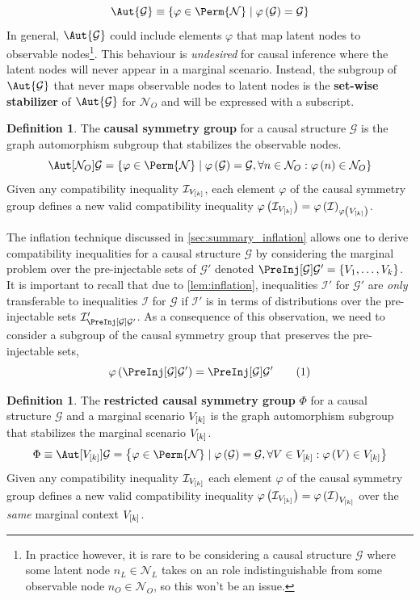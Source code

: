 \documentclass[aps, 10pt, english, twoside, pra, nofootinbib, longbibliography]{revtex4-1}
\theoremstyle{plain}
\theoremstyle{definition}
\newtheorem{definition}[theorem]{Definition}
\theoremstyle{remark}
\newcommand{\graph}{\mathcal{G}}
\newcommand{\nodes}{\mathcal{N}}
\newcommand{\term}[1]{\textcolor{Mahogany}{\textbf{#1}}}
\begin{document}
    \[ \Aut{\graph} \defined \bc{\varphi \in \Perm{\nodes} \mid \varphi\br{\graph} = \graph} \]
    In general, $\Aut{\graph}$ could include elements $\varphi$ that map latent nodes to observable nodes\footnote{In practice however, it is rare to be considering a causal structure $\graph$ where some latent node $n_L \in \nodes_L$ takes on an role indistinguishable from some observable node $n_O \in \nodes_O$, so this won't be an issue.}. This behaviour is \textit{undesired} for causal inference where the latent nodes will never appear in a marginal scenario. Instead, the subgroup of $\Aut{\graph}$ that never maps observable nodes to latent nodes is the \term{set-wise stabilizer} of $\Aut{\graph}$ for $\nodes_O$ and will be expressed with a subscript.

    \begin{definition}
        The \term{causal symmetry group} for a causal structure $\graph$ is the graph automorphism subgroup that stabilizes the observable nodes.
        \[ \Aut[\nodes_O]{\graph} = \bc{\varphi \in \Perm{\nodes} \mid \varphi\br{\graph} = \graph, \forall n \in \nodes_O :\varphi\br{n} \in \nodes_O} \]
        Given any compatibility inequality $\mathcal{I}_{V_{\left[ k \right]}}$, each element $\varphi$ of the causal symmetry group defines a new valid compatibility inequality $\varphi\left( \mathcal{I}_{V_{\left[ k \right]}} \right) = \varphi\left( \mathcal{I} \right)_{\varphi\left( V_{\left[ k \right]} \right)}$.
    \end{definition}

    The inflation technique discussed in \cref{sec:summary_inflation} allows one to derive compatibility inequalities for a causal structure $\graph$ by considering the marginal problem over the pre-injectable sets of $\graph'$ denoted $\PreInj[\graph]{\graph'} = \bc{V_1, \ldots, V_k}$. It is important to recall that due to \cref{lem:inflation}, inequalities $\mathcal{I}'$ for $\graph'$ are \textit{only} transferable to inequalities $\mathcal{I}$ for $\graph$ if $\mathcal{I}'$ is in terms of distributions over the pre-injectable sets $\mathcal{I}'_{\PreInj[\graph]{\graph'}}$. As a consequence of this observation, we need to consider a subgroup of the causal symmetry group that preserves the pre-injectable sets,
    \[ \varphi\br{\PreInj[\graph]{\graph'}} = \PreInj[\graph]{\graph'} \eq \label{eq:preserved_preinj} \]

    \begin{definition}
        The \term{restricted causal symmetry group} $\Phi$ for a causal structure $\graph$ and a marginal scenario $V_{\left[ k \right]}$ is the graph automorphism subgroup that stabilizes the marginal scenario $V_{\left[ k \right]}$.
        \[ \Phi \defined \Aut[V_{\bs{k}}]{\graph} = \bc{\varphi \in \Perm{\nodes} \mid \varphi\br{\graph} = \graph, \forall V \in V_{\bs{k}} : \varphi\br{V} \in V_{\bs{k}}} \]
        Given any compatibility inequality $\mathcal{I}_{V_{\left[ k \right]}}$ each element $\varphi$ of the causal symmetry group defines a new valid compatibility inequality $\varphi\left( \mathcal{I}_{V_{\left[ k \right]}} \right) = \varphi\left( \mathcal{I} \right)_{V_{\left[ k \right]}}$ over the \textit{same} marginal context $V_{\left[ k \right]}$.
    \end{definition}
\end{document}
